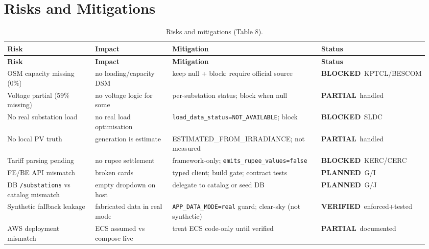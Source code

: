 \documentclass[11pt,a4paper]{article}
\newcommand{\stV}{\textcolor{cok}{\textbf{VERIFIED}}}
\newcommand{\stP}{\textcolor{cpart}{\textbf{PARTIAL}}}
\newcommand{\stB}{\textcolor{cmiss}{\textbf{BLOCKED}}}
\newcommand{\stPlan}{\textcolor{cplan}{\textbf{PLANNED}}}
\newcommand{\code}[1]{\texttt{\small #1}}
\begin{document}
\section{Risks and Mitigations}
\begin{footnotesize}
\begin{longtable}{@{}p{3.6cm}p{3.2cm}p{4.6cm}p{2.4cm}@{}}
\caption{Risks and mitigations (Table 8).}\label{tab:risk}\\
\toprule
\textbf{Risk} & \textbf{Impact} & \textbf{Mitigation} & \textbf{Status}\\
\midrule
\endfirsthead
\toprule
\textbf{Risk} & \textbf{Impact} & \textbf{Mitigation} & \textbf{Status}\\
\midrule
\endhead
\bottomrule
\endfoot
OSM capacity missing (0\%) & no loading/capacity DSM & keep null + block; require official source & \stB\ KPTCL/BESCOM\\
Voltage partial (59\% missing) & no voltage logic for some & per-substation status; block when null & \stP\ handled\\
No real substation load & no real load optimisation & \code{load\_data\_status=NOT\_AVAILABLE}; block & \stB\ SLDC\\
No local PV truth & generation is estimate & ESTIMATED\_FROM\_IRRADIANCE; not measured & \stP\ handled\\
Tariff parsing pending & no rupee settlement & framework-only; \code{emits\_rupee\_values=false} & \stB\ KERC/CERC\\
FE/BE API mismatch & broken cards & typed client; build gate; contract tests & \stPlan\ G/I\\
DB \code{/substations} vs catalog mismatch & empty dropdown on host & delegate to catalog or seed DB & \stPlan\ G/J\\
Synthetic fallback leakage & fabricated data in real mode & \code{APP\_DATA\_MODE=real} guard; clear-sky (not synthetic) & \stV\ enforced+tested\\
AWS deployment mismatch & ECS assumed vs compose live & treat ECS code-only until verified & \stP\ documented\\
\end{longtable}
\end{footnotesize}

\end{document}
